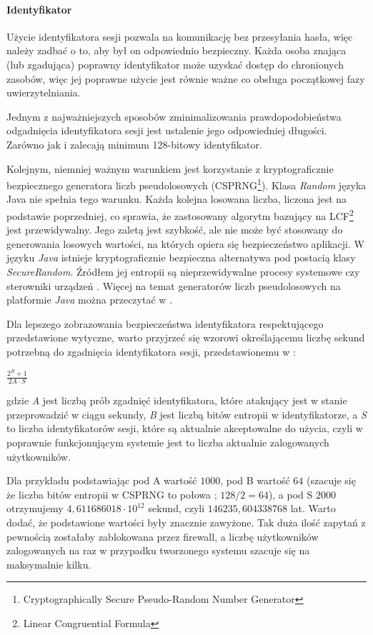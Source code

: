 \documentclass[11pt]{aghdpl}
\begin{document}
\paragraph{Identyfikator}
\label{sec:identyfikator}

Użycie identyfikatora sesji pozwala na komunikację bez przesyłania hasła, więc należy zadbać o to, aby był on odpowiednio bezpieczny. Każda osoba znająca (lub zgadująca) poprawny identyfikator może uzyskać dostęp do chronionych zasobów, więc jej poprawne użycie jest równie ważne co obsługa początkowej fazy uwierzytelniania.

Jednym z najważniejszych sposobów zminimalizowania prawdopodobieństwa odgadnięcia identyfikatora sesji jest ustalenie jego odpowiedniej długości. Zarówno \cite{SId} jak i \cite{SeMa08} zalecają minimum 128-bitowy identyfikator.

Kolejnym, niemniej ważnym warunkiem jest korzystanie z kryptograficznie bezpiecznego generatora liczb pseudolosowych (CSPRNG\footnote{Cryptographically Secure Pseudo-Random Number Generator}). Klasa \emph{Random} języka Java nie spełnia tego warunku. Każda kolejna losowana liczba, liczona jest na podstawie poprzedniej, co sprawia, że zastosowany algorytm bazujący na LCF\footnote{Linear Congruential Formula} jest przewidywalny. Jego zaletą jest szybkość, ale nie może być stosowany do generowania losowych wartości, na których opiera się bezpieczeństwo aplikacji. W języku \emph{Java} istnieje kryptograficznie bezpieczna alternatywa pod postacią klasy \emph{SecureRandom}. Źródłem jej entropii są nieprzewidywalne procesy systemowe czy sterowniki urządzeń \cite{RND}. Więcej na temat generatorów liczb pseudolosowych na platformie \emph{Java} można przeczytać w \cite{SRNGiJ}.

Dla lepszego zobrazowania bezpieczeństwa identyfikatora respektującego przedstawione wytyczne, warto przyjrzeć się wzorowi określającemu liczbę sekund potrzebną do zgadnięcia identyfikatora sesji, przedstawionemu w \cite{SId}:

$\frac{2^{B} + 1}{2A \cdot S}$

gdzie \emph{A} jest liczbą prób zgadnięć identyfikatora, które atakujący jest w stanie przeprowadzić w ciągu sekundy, \emph{B} jest liczbą bitów entropii w identyfikatorze, a \emph{S} to liczba identyfikatorów sesji, które są aktualnie akceptowalne do użycia, czyli w poprawnie funkcjonującym systemie jest to liczba aktualnie zalogowanych użytkowników.

Dla przykładu podstawiając pod A wartość $1000$, pod B wartość $64$ (szacuje się że liczba bitów entropii w CSPRNG to połowa \cite{SId}; $128/2=64$), a pod S $2000$ otrzymujemy $4,611686018\cdot10^{12}$ sekund, czyli $146235,604338768$ lat. Warto dodać, że podstawione wartości były znacznie zawyżone. Tak duża ilość zapytań z pewnością zostałaby zablokowana przez firewall, a liczbę użytkowników zalogowanych na raz w przypadku tworzonego systemu szacuje się na maksymalnie kilku.
\end{document}
